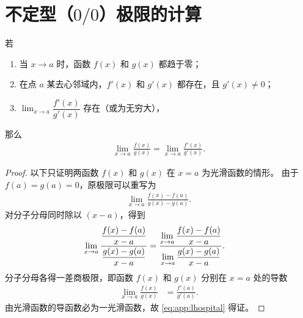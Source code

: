 
\chapter{不定型（$0/0$）极限的计算}
\begin{theorem}[L'Hospital法则]
  若
  \begin{enumerate}
  \item 当 $x \to a$ 时，函数 $f(x)$ 和 $g(x)$ 都趋于零；
  \item 在点 $a$ 某去心邻域内，$f'(x)$ 和 $g'(x)$ 都存在，且 $g'(x)\neq 0$；
  \item $\displaystyle\lim_{x \to a} \dfrac{f'(x)}{g'(x)}$ 存在（或为无穷大），
  \end{enumerate}
  那么
  \begin{align}
    \label{eq:app:lhospital}
    \lim_{x \to a} \frac{f(x)}{g(x)} = \lim_{x \to a} \frac{f'(x)}{g'(x)}.
  \end{align}
\end{theorem}
\begin{proof}
  以下只证明两函数 $f(x)$ 和 $g(x)$ 在 $x = a$ 为光滑函数的情形。
  由于 $f(a) = g(a) = 0$，原极限可以重写为
  \begin{align*}
    \lim_{x \to a} \frac{f(x) - f(a)}{g(x) - g(a)}.
  \end{align*}
  对分子分母同时除以 $(x - a)$，得到
  \begin{align*}
    \lim_{x \to a} \frac{%
      \dfrac{f(x) - f(a)}{x - a}
    }{%
      \dfrac{g(x) - g(a)}{x - a}
    } &
    = \frac{%
      \displaystyle\lim_{x \to a} \frac{f(x) - f(a)}{x - a}
    }{%
      \displaystyle\lim_{x \to a} \frac{g(x) - g(a)}{x - a}
    }.
  \end{align*}
  分子分母各得一差商极限，即函数 $f(x)$ 和 $g(x)$ 分别在 $x = a$ 处的导数
  \begin{align*}
    \lim_{x \to a} \frac{f(x)}{g(x)} &
    = \frac{f'(a)}{g'(a)}.
  \end{align*}
  由光滑函数的导函数必为一光滑函数，故 \eqref{eq:app:lhospital} 得证。
\end{proof}
